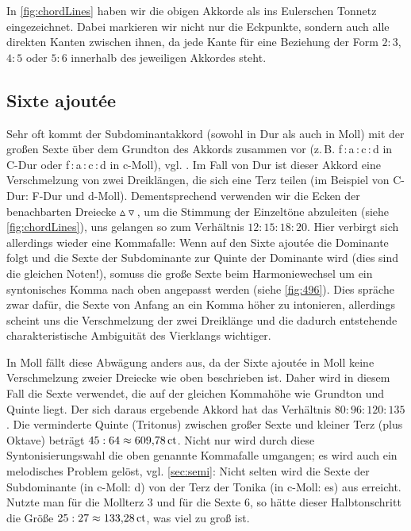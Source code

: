 In \cref{fig:chordLines} haben wir die obigen Akkorde als ins Eulerschen Tonnetz
eingezeichnet. Dabei markieren wir nicht nur die Eckpunkte, sondern auch alle
direkten Kanten zwischen ihnen, da jede Kante für eine Beziehung der Form $2:3$,
$4:5$ oder $5:6$ innerhalb des jeweiligen Akkordes steht.

\subsection{Sixte ajoutée}

Sehr oft kommt der Subdominantakkord (sowohl in Dur als auch in Moll) mit der
großen Sexte über dem Grundton des Akkords zusammen vor
(z.\,B. f\,:\,a\,:\,c\,:\,d in C-Dur oder f\,:\,\flat a\,:\,c\,:\,d in c-Moll),
vgl. \cite[{}9.3]{Skript}.  Im Fall von Dur ist dieser Akkord eine Verschmelzung
von zwei Dreiklängen, die sich eine Terz teilen (im Beispiel von C-Dur: F-Dur
und d-Moll). Dementsprechend verwenden wir die Ecken der benachbarten Dreiecke
$\vartriangle\!\!\!\triangledown$, um die Stimmung der Einzeltöne abzuleiten
(siehe \cref{fig:chordLines}), uns gelangen so zum Verhältnis
$12:15:18:20$. Hier verbirgt sich allerdings wieder eine Kommafalle: Wenn auf
den Sixte ajoutée die Dominante folgt und die Sexte der Subdominante zur Quinte
der Dominante wird (dies sind die gleichen Noten!), somuss die große Sexte beim
Harmoniewechsel um ein syntonisches Komma nach oben angepasst werden (siehe
\cref{fig:496}).  Dies spräche zwar dafür, die Sexte von Anfang an ein Komma
höher zu intonieren, allerdings scheint uns die Verschmelzung der zwei
Dreiklänge und die dadurch entstehende charakteristische Ambiguität des
Vierklangs wichtiger.

In Moll fällt diese Abwägung anders aus, da der Sixte ajoutée in Moll keine
Verschmelzung zweier Dreiecke wie oben beschrieben ist.  Daher wird in diesem
Fall die Sexte verwendet, die auf der gleichen Kommahöhe wie Grundton und Quinte
liegt. Der sich daraus ergebende Akkord hat das Verhältnis $80:96:120:135$.  Die
verminderte Quinte (Tritonus) zwischen großer Sexte und kleiner Terz (plus
Oktave) beträgt $45:64\approx 609{,}78\,\mathrm{ct}$.  Nicht nur wird durch diese
Syntonisierungswahl die oben genannte Kommafalle umgangen; es wird auch ein
melodisches Problem gelöst, vgl. \cref{sec:semi}: Nicht selten wird die Sexte
der Subdominante (in c-Moll: d) von der Terz der Tonika (in c-Moll: es) aus
erreicht.  Nutzte man für die Mollterz \flatp $3$ und für die Sexte \naturalp
$6$, so hätte dieser Halbtonschritt die Größe $25:27\approx 133{,}28\,\mathrm{ct}$,
was viel zu groß ist.

